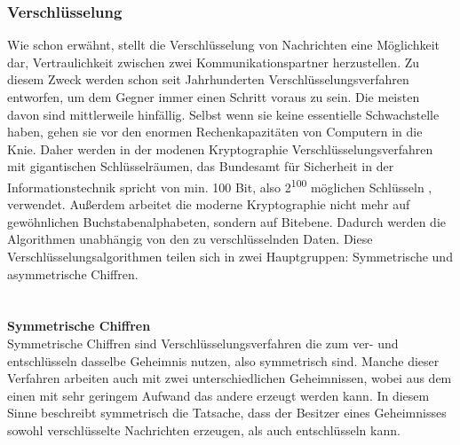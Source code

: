 \documentclass[13pt,a4paper,bibliography=totocnumbered,listof=totocnumbered]{scrartcl}
\begin{document}
\subsubsection{Verschlüsselung}
Wie schon erwähnt, stellt die Verschlüsselung von Nachrichten eine Möglichkeit dar, Vertraulichkeit zwischen zwei Kommunikationspartner herzustellen. Zu diesem Zweck werden schon seit Jahrhunderten Verschlüsselungsverfahren entworfen, um dem Gegner immer einen Schritt voraus zu sein. Die meisten davon sind mittlerweile hinfällig. Selbst wenn sie keine essentielle Schwachstelle haben, gehen sie vor den enormen Rechenkapazitäten von Computern in die Knie. Daher werden in der modenen Kryptographie Verschlüsselungsverfahren mit gigantischen Schlüsselräumen, das Bundesamt für Sicherheit in der Informationstechnik spricht von min. 100 Bit, also 2\textsuperscript{100} möglichen Schlüsseln  \cite[S. 15]{13}, verwendet. Außerdem arbeitet die moderne Kryptographie nicht mehr auf gewöhnlichen Buchstabenalphabeten, sondern auf Bitebene. Dadurch werden die Algorithmen unabhängig von den zu verschlüsselnden Daten. Diese Verschlüsselungsalgorithmen teilen sich in zwei Hauptgruppen: Symmetrische und asymmetrische Chiffren.\\
\cite[S. 1]{42} \cite[S. 15]{48}
\\\\\textbf{Symmetrische Chiffren}\\
Symmetrische Chiffren sind Verschlüsselungsverfahren die zum ver- und entschlüsseln dasselbe Geheimnis nutzen, also symmetrisch sind. Manche dieser Verfahren arbeiten auch mit zwei unterschiedlichen Geheimnissen, wobei aus dem einen mit sehr geringem Aufwand das andere erzeugt werden kann. In diesem Sinne beschreibt symmetrisch die Tatsache, dass der Besitzer eines Geheimnisses sowohl verschlüsselte Nachrichten erzeugen, als auch entschlüsseln kann.
\end{document}
